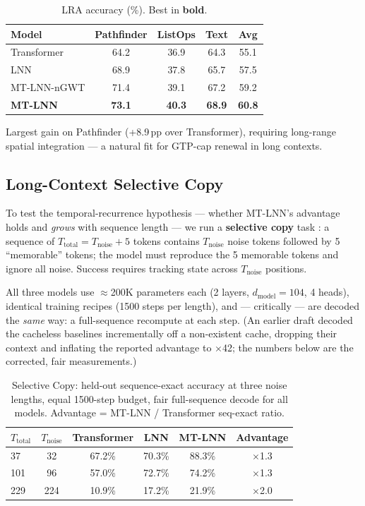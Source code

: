 \documentclass[11pt]{article}
\theoremstyle{definition}
\begin{document}
\begin{table}[h]
\centering
\caption{LRA accuracy (\%). Best in \textbf{bold}.}
\label{tab:lra}
\begin{tabular}{lcccc}
\toprule
Model & Pathfinder & ListOps & Text & Avg \\
\midrule
Transformer  & 64.2 & 36.9 & 64.3 & 55.1 \\
LNN          & 68.9 & 37.8 & 65.7 & 57.5 \\
MT-LNN-nGWT  & 71.4 & 39.1 & 67.2 & 59.2 \\
\textbf{MT-LNN} & \textbf{73.1} & \textbf{40.3} & \textbf{68.9} & \textbf{60.8} \\
\bottomrule
\end{tabular}
\end{table}

Largest gain on Pathfinder (+8.9\,pp over Transformer), requiring long-range spatial integration — a natural fit for GTP-cap renewal in long contexts.

\subsection{Long-Context Selective Copy}
\label{sec:long_context}

To test the temporal-recurrence hypothesis — whether MT-LNN's advantage holds and \emph{grows} with sequence length — we run a \textbf{selective copy} task \citep{arjovsky2016unitary}: a sequence of $T_\text{total} = T_\text{noise} + 5$ tokens contains $T_\text{noise}$ noise tokens followed by 5 ``memorable'' tokens; the model must reproduce the 5 memorable tokens and ignore all noise. Success requires tracking state across $T_\text{noise}$ positions.

All three models use $\approx$200K parameters each (2 layers, $d_\text{model}=104$, 4 heads), identical training recipes (1500 steps per length), and — critically — are decoded the \emph{same} way: a full-sequence recompute at each step. (An earlier draft decoded the cacheless baselines incrementally off a non-existent cache, dropping their context and inflating the reported advantage to $\times$42; the numbers below are the corrected, fair measurements.)

\begin{table}[h]
\centering
\caption{Selective Copy: held-out sequence-exact accuracy at three noise lengths, equal 1500-step budget, fair full-sequence decode for all models. Advantage = MT-LNN / Transformer seq-exact ratio.}
\label{tab:long_ctx}
\begin{tabular}{lccccc}
\toprule
$T_\text{total}$ & $T_\text{noise}$ & Transformer & LNN & MT-LNN & Advantage \\
\midrule
37   &  32 & 67.2\% & 70.3\% & 88.3\% & $\times$1.3 \\
101  &  96 & 57.0\% & 72.7\% & 74.2\% & $\times$1.3 \\
229  & 224 & 10.9\% & 17.2\% & 21.9\% & $\times$2.0 \\
\bottomrule
\end{tabular}
\end{table}
\end{document}
